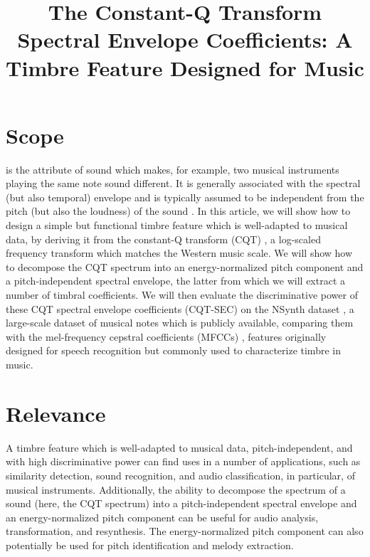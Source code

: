 \documentclass[journal]{IEEEtran}
\begin{document}
\title{The Constant-Q Transform Spectral Envelope Coefficients: A Timbre Feature Designed for Music}

\maketitle

\section{Scope}

 is the attribute of sound which makes, for example, two musical instruments playing the same note sound different. It is generally associated with the spectral (but also temporal) envelope and is typically assumed to be independent from the pitch (but also the loudness) of the sound \cite{moore2004}. In this article, we will show how to design a simple but functional timbre feature which is well-adapted to musical data, by deriving it from the constant-Q transform (CQT) \cite{brown1991, brown1992}, a log-scaled frequency transform which matches the Western music scale. We will show how to decompose the CQT spectrum into an energy-normalized pitch component and a pitch-independent spectral envelope, the latter from which we will extract a number of timbral coefficients. We will then evaluate the discriminative power of these CQT spectral envelope coefficients (CQT-SEC) on the NSynth dataset \cite{engel2017}, a large-scale dataset of musical notes which is publicly available, comparing them with the mel-frequency cepstral coefficients (MFCCs) \cite{mermelstein1976}, features originally designed for speech recognition but commonly used to characterize timbre in music. 


\section{Relevance}

A timbre feature which is well-adapted to musical data, pitch-independent, and with high discriminative power can find uses in a number of applications, such as similarity detection, sound recognition, and audio classification, in particular, of musical instruments. Additionally, the ability to decompose the spectrum of a sound (here, the CQT spectrum) into a pitch-independent spectral envelope and an energy-normalized pitch component can be useful for audio analysis, transformation, and resynthesis. The energy-normalized pitch component can also potentially be used for pitch identification and melody extraction. 
\end{document}
